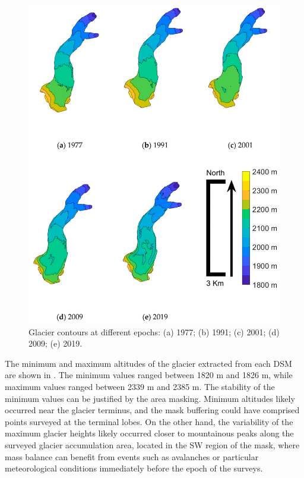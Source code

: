 \begin{figure}[ht]
    \centering
    \includegraphics[height=0.9\textheight]{results_contours.png}
    \caption{Glacier contours at different epochs: (a) 1977; (b) 1991; (c) 2001; (d) 2009; (e) 2019.}
    \label{fig:2:results_contour}
\end{figure}

The minimum and maximum altitudes of the glacier extracted from each DSM are shown in .
The minimum values ranged between 1820 m and 1826 m, while maximum values ranged between 2339 m and 2385 m. 
The stability of the minimum values can be justified by the area masking. 
Minimum altitudes likely occurred near the glacier terminus, and the mask buffering could have comprised points surveyed at the terminal lobes.
On the other hand, the variability of the maximum glacier heights likely occurred closer to mountainous peaks along the surveyed glacier accumulation area, located in the SW region of the mask, where mass balance can benefit from events such as avalanches or particular meteorological conditions immediately before the epoch of the surveys.

